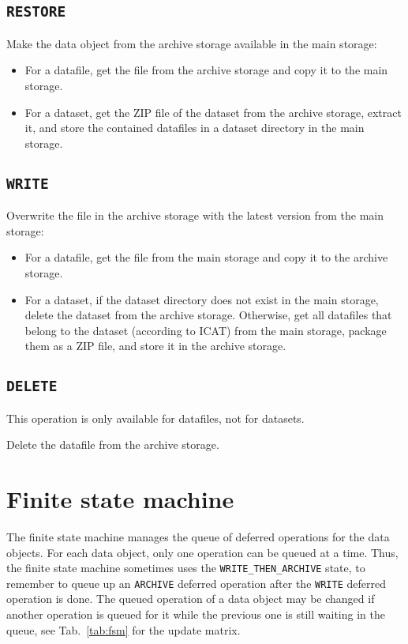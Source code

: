 \documentclass[paper=a4]{scrartcl}
\begin{document}
\subsection{\texttt{RESTORE}}
\label{sec:defops:restore}

Make the data object from the archive storage available in the
main storage:
\begin{itemize}[noitemsep,topsep=0pt]
\item For a datafile, get the file from the archive storage and
copy it to the main storage.
\item For a dataset, get the ZIP file of the dataset from the
archive storage, extract it, and store the contained datafiles in a
dataset directory in the main storage.
\end{itemize}

\subsection{\texttt{WRITE}}
\label{sec:defops:write}

Overwrite the file in the archive storage with the latest version
from the main storage:
\begin{itemize}[noitemsep,topsep=0pt]
\item For a datafile, get the file from the main storage and copy it
to the archive storage.
\item For a dataset, if the dataset directory does not exist in the
main storage, delete the dataset from the archive storage. Otherwise,
get all datafiles that belong to the dataset (according to ICAT) from
the main storage, package them as a ZIP file, and store it in the
archive storage.
\end{itemize}

\subsection{\texttt{DELETE}}
\label{sec:defops:delete}

This operation is only available for datafiles, not for datasets.

Delete the datafile from the archive storage.


\section{Finite state machine}
\label{sec:fsm}

The finite state machine manages the queue of deferred operations for
the data objects.  For each data object, only one operation can be
queued at a time.  Thus, the finite state machine sometimes uses the
\texttt{WRITE\_THEN\_ARCHIVE} state, to remember to queue up an
\texttt{ARCHIVE} deferred operation after the \texttt{WRITE} deferred
operation is done.  The queued operation of a data object may be
changed if another operation is queued for it while the previous one
is still waiting in the queue, see Tab.\ \ref{tab:fsm} for the update
matrix.
\end{document}
